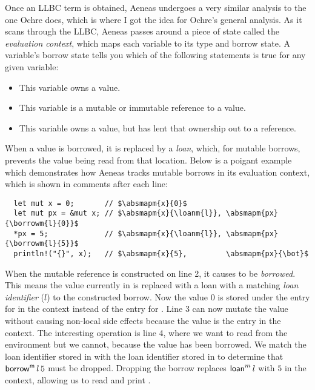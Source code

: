 \documentclass[12pt,twoside]{report}
\begin{document}
Once an LLBC term is obtained, Aeneas undergoes a very similar analysis to the one Ochre does, which is where I got the idea for Ochre's general analysis. As it scans through the LLBC, Aeneas passes around a piece of state called the \textit{evaluation context}, which maps each variable to its type and borrow state. A variable's borrow state tells you which of the following statements is true for any given variable:

\begin{itemize}
  \item This variable owns a value.
  \item This variable is a mutable or immutable reference to a value.
  \item This variable owns a value, but has lent that ownership out to a reference.
\end{itemize}

When a value is borrowed, it is replaced by a \textit{loan}, which, for mutable borrows, prevents the value being read from that location. Below is a poigant example which demonstrates how Aeneas tracks mutable borrows in its evaluation context, which is shown in comments after each line:

\begin{verbatim}
  let mut x = 0;       // $\absmapm{x}{0}$
  let mut px = &mut x; // $\absmapm{x}{\loanm{l}}, \absmapm{px}{\borrowm{l}{0}}$
  *px = 5;             // $\absmapm{x}{\loanm{l}}, \absmapm{px}{\borrowm{l}{5}}$
  println!("{}", x);   // $\absmapm{x}{5},         \absmapm{px}{\bot}$
\end{verbatim}

When the mutable reference is constructed on line 2, it causes  to be \textit{borrowed}. This means the value currently in  is replaced with a loan with a matching \textit{loan identifier} ($l$) to the constructed borrow. Now the value $0$ is stored under the entry for  in the context instead of the entry for . Line 3 can now mutate the value without causing non-local side effects because the value is the  entry in the context. The interesting operation is line 4, where we want to read  from the environment but we cannot, because the value has been borrowed. We match the loan identifier stored in  with the loan identifier stored in  to determine that $\mathsf{borrow}^{\mathsf{m}}\,l\,5$ must be dropped. Dropping the borrow replaces $\mathsf{loan}^m\,l$ with $5$ in the context, allowing us to read and print .
\end{document}
